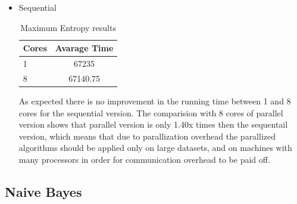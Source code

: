 \documentclass{report}
\begin{document}
\begin{itemize}
\item{Sequential}

\begin{table}[!htb]
\centering
\begin{tabular}{ l c }
    \hline\hline
    Cores & Avarage Time \\ [0.2ex]
    \hline
    1 &  67235 \\
    8 & 67140.75  \\
    \hline
  \end{tabular}
\label{table:maxentres2}
\caption{Maximum Entropy results}
\end{table}

As expected there is no improvement in the running time between 1 and 8 cores for the sequential version.  The comparision with 8 cores of parallel version shows that parallel version is only 1.40x times then the sequentail version, which means that due to parallization overhead the parallized algorithms should be applied only on large datasets, and on machines with many processors in order for communication overhead to be paid off.

\end{itemize}

\subsection{Naive Bayes}
\end{document}
